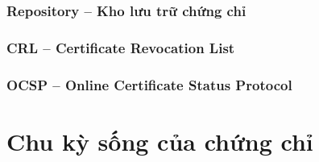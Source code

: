 \subsubsection*{Repository -- Kho lưu trữ chứng chỉ}

\subsubsection*{CRL -- Certificate Revocation List}

\subsubsection*{OCSP -- Online Certificate Status Protocol}


\section{Chu kỳ sống của chứng chỉ}
\label{sec:3.4}

